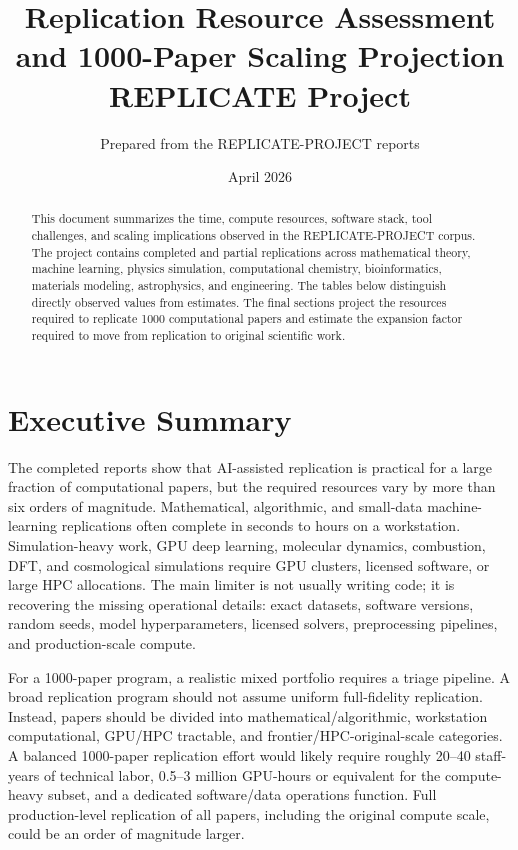 \documentclass[11pt,letterpaper]{article}
\title{\textbf{Replication Resource Assessment and 1000-Paper Scaling Projection}\\
\large REPLICATE Project}
\author{Prepared from the REPLICATE-PROJECT reports}
\date{April 2026}
\begin{document}
\maketitle

\begin{abstract}
This document summarizes the time, compute resources, software stack, tool challenges, and scaling implications observed in the REPLICATE-PROJECT corpus. The project contains completed and partial replications across mathematical theory, machine learning, physics simulation, computational chemistry, bioinformatics, materials modeling, astrophysics, and engineering. The tables below distinguish directly observed values from estimates. The final sections project the resources required to replicate 1000 computational papers and estimate the expansion factor required to move from replication to original scientific work.
\end{abstract}

\section{Executive Summary}

The completed reports show that AI-assisted replication is practical for a large fraction of computational papers, but the required resources vary by more than six orders of magnitude. Mathematical, algorithmic, and small-data machine-learning replications often complete in seconds to hours on a workstation. Simulation-heavy work, GPU deep learning, molecular dynamics, combustion, DFT, and cosmological simulations require GPU clusters, licensed software, or large HPC allocations. The main limiter is not usually writing code; it is recovering the missing operational details: exact datasets, software versions, random seeds, model hyperparameters, licensed solvers, preprocessing pipelines, and production-scale compute.

For a 1000-paper program, a realistic mixed portfolio requires a triage pipeline. A broad replication program should not assume uniform full-fidelity replication. Instead, papers should be divided into mathematical/algorithmic, workstation computational, GPU/HPC tractable, and frontier/HPC-original-scale categories. A balanced 1000-paper replication effort would likely require roughly 20--40 staff-years of technical labor, 0.5--3 million GPU-hours or equivalent for the compute-heavy subset, and a dedicated software/data operations function. Full production-level replication of all papers, including the original compute scale, could be an order of magnitude larger.
\end{document}
